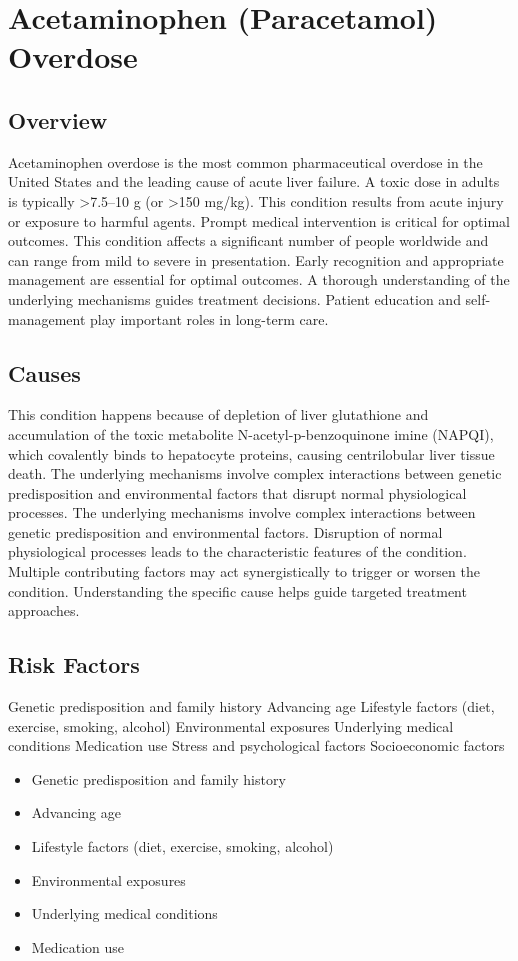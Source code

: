 \chapter{Acetaminophen (Paracetamol) Overdose}
\label{sec:Acetaminophen Overdose}

\section{Overview}
Acetaminophen overdose is the most common pharmaceutical overdose in the United States and the leading cause of acute liver failure. A toxic dose in adults is typically >7.5--10 g (or >150 mg/kg). This condition results from acute injury or exposure to harmful agents. Prompt medical intervention is critical for optimal outcomes. This condition affects a significant number of people worldwide and can range from mild to severe in presentation. Early recognition and appropriate management are essential for optimal outcomes. A thorough understanding of the underlying mechanisms guides treatment decisions. Patient education and self-management play important roles in long-term care.
\section{Causes}
This condition happens because of depletion of liver glutathione and accumulation of the toxic metabolite N-acetyl-p-benzoquinone imine (NAPQI), which covalently binds to hepatocyte proteins, causing centrilobular liver tissue death. The underlying mechanisms involve complex interactions between genetic predisposition and environmental factors that disrupt normal physiological processes. The underlying mechanisms involve complex interactions between genetic predisposition and environmental factors. Disruption of normal physiological processes leads to the characteristic features of the condition. Multiple contributing factors may act synergistically to trigger or worsen the condition. Understanding the specific cause helps guide targeted treatment approaches.
\section{Risk Factors}
Genetic predisposition and family history Advancing age Lifestyle factors (diet, exercise, smoking, alcohol) Environmental exposures Underlying medical conditions Medication use Stress and psychological factors Socioeconomic factors

\begin{itemize}[noitemsep]
  \item Genetic predisposition and family history
  \item Advancing age
  \item Lifestyle factors (diet, exercise, smoking, alcohol)
  \item Environmental exposures
  \item Underlying medical conditions
  \item Medication use
\end{itemize}
